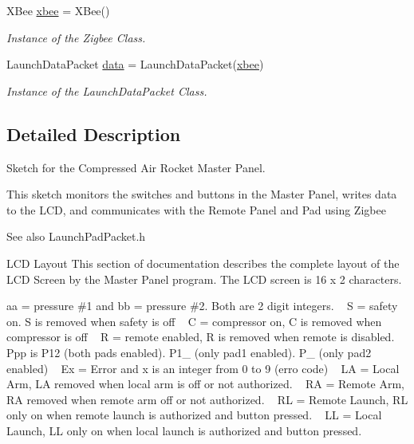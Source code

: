 \begin{DoxyCompactItemize}
X\+Bee \hyperlink{masterPanel_8ino_a18bbd7dece9ef587254b08710426fd17}{xbee} = X\+Bee()
\begin{DoxyCompactList}\small\item\em Instance of the Zigbee Class. \end{DoxyCompactList}\item 
Launch\+Data\+Packet \hyperlink{masterPanel_8ino_a2581ee7316bbd0b2c1f26d7892d9383b}{data} = Launch\+Data\+Packet(\hyperlink{masterPanel_8ino_a18bbd7dece9ef587254b08710426fd17}{xbee})
\begin{DoxyCompactList}\small\item\em Instance of the Launch\+Data\+Packet Class. \end{DoxyCompactList}\end{DoxyCompactItemize}


\subsection{Detailed Description}
Sketch for the Compressed Air Rocket Master Panel. 

This sketch monitors the switches and buttons in the Master Panel, writes data to the L\+CD, and communicates with the Remote Panel and Pad using Zigbee \begin{DoxySeeAlso}{See also}
Launch\+Pad\+Packet.\+h
\end{DoxySeeAlso}
L\+CD Layout This section of documentation describes the complete layout of the L\+CD Screen by the Master Panel program. The L\+CD screen is 16 x 2 characters. 


aa = pressure \#1 and bb = pressure \#2. Both are 2 digit integers. ~\newline
 S = safety on. S is removed when safety is off ~\newline
 C = compressor on, C is removed when compressor is off ~\newline
 R = remote enabled, R is removed when remote is disabled. ~\newline
 Ppp is P12 (both pads enabled). P1\+\_\+ (only pad1 enabled). P\+\_ (only pad2 enabled) ~\newline
 Ex = Error and x is an integer from 0 to 9 (erro code) ~\newline
 LA = Local Arm, LA removed when local arm is off or not authorized. ~\newline
 RA = Remote Arm, RA removed when remote arm off or not authorized. ~\newline
 RL = Remote Launch, RL only on when remote launch is authorized and button pressed. ~\newline
 LL = Local Launch, LL only on when local launch is authorized and button pressed. 

